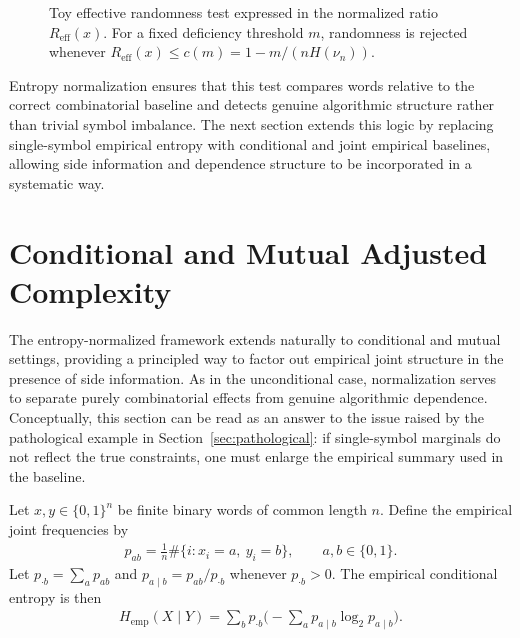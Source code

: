 \documentclass[12pt]{article}
\newcommand{\be}{\begin{eqnarray}}
\newcommand{\ee}{\end{eqnarray}}
\begin{document}
\begin{figure}[t]
\centering
{}
\caption{\small Toy effective randomness test expressed in the normalized ratio
$R_{\mathrm{eff}}(x)$. For a fixed deficiency threshold $m$, randomness is
rejected whenever $R_{\mathrm{eff}}(x)\le c(m)=1-m/(nH(\nu_n))$.}
\label{fig:toy_test}
\end{figure}

Entropy normalization ensures that this test compares words relative to the
correct combinatorial baseline and detects genuine algorithmic structure rather
than trivial symbol imbalance. The next section extends this logic by replacing
single-symbol empirical entropy with conditional and joint empirical baselines,
allowing side information and dependence structure to be incorporated in a
systematic way.

\section{Conditional and Mutual Adjusted Complexity}
\label{sec:conditional_mutual}

The entropy-normalized framework extends naturally to conditional and mutual
settings, providing a principled way to factor out empirical joint structure in
the presence of side information. As in the unconditional case, normalization
serves to separate purely combinatorial effects from genuine algorithmic
dependence. Conceptually, this section can be read as an answer to the issue raised by the pathological example in Section~\ref{sec:pathological}: if single-symbol marginals do not reflect the true constraints, one must enlarge the empirical summary used in the baseline.

Let $x,y\in\{0,1\}^n$ be finite binary words of common length $n$.
Define the empirical joint frequencies by
\be
p_{ab}=\frac{1}{n}\#\{i:x_i=a,\ y_i=b\}, \qquad a,b\in\{0,1\}.
\label{eq:joint_freqs}
\ee
Let $p_{\cdot b}=\sum_a p_{ab}$ and $p_{a\mid b}=p_{ab}/p_{\cdot b}$ whenever
$p_{\cdot b}>0$. The empirical conditional entropy is then
\be
H_{\mathrm{emp}}(X\mid Y)
=
\sum_b p_{\cdot b}
\Big(-\sum_a p_{a\mid b}\log_2 p_{a\mid b}\Big).
\label{eq:emp_cond_entropy}
\ee
\end{document}
